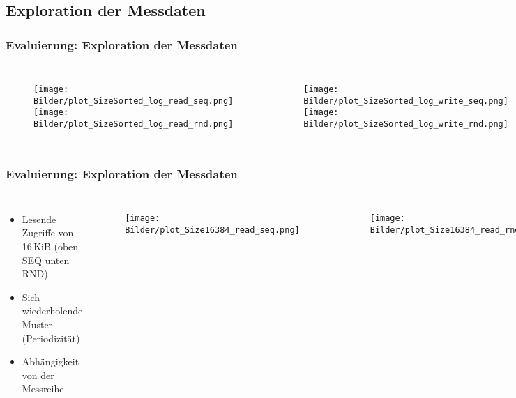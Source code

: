 \documentclass{beamer}
\begin{document}
\subsection{Exploration der Messdaten}
\begin{frame}
\frametitle{Evaluierung: Exploration der Messdaten}
\begin{columns}
	\begin{figure}
		\texttt{[image: Bilder/plot\_SizeSorted\_log\_read\_seq.png]}\\
		\texttt{[image: Bilder/plot\_SizeSorted\_log\_read\_rnd.png]}
	\end{figure}
	\begin{figure}
		\texttt{[image: Bilder/plot\_SizeSorted\_log\_write\_seq.png]}\\
		\texttt{[image: Bilder/plot\_SizeSorted\_log\_write\_rnd.png]}
	\end{figure}
\end{columns}
\end{frame}

\begin{frame}
\frametitle{Evaluierung: Exploration der Messdaten}
\begin{columns}
\begin{itemize}
	\item Lesende Zugriffe von 16\,KiB (oben SEQ unten RND)
	\item Sich wiederholende Muster (Periodizität)
	\item Abhängigkeit von der Messreihe
\end{itemize}
	\begin{figure}
		\texttt{[image: Bilder/plot\_Size16384\_read\_seq.png]}
	\end{figure}
	\begin{figure}
		\texttt{[image: Bilder/plot\_Size16384\_read\_rnd.png]}
	\end{figure}
\end{columns}
\end{frame}
\end{document}
